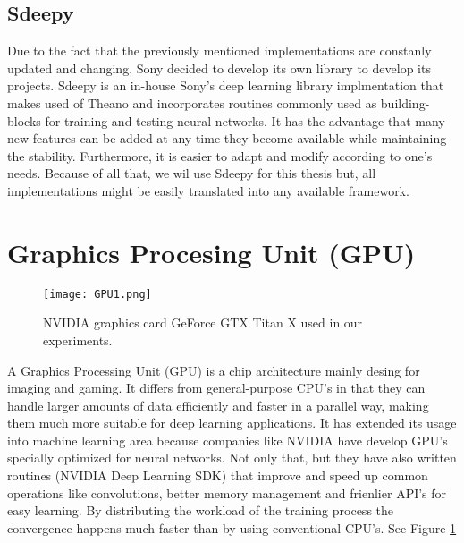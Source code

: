 \subsection{Sdeepy}
Due to the fact that the previously mentioned implementations are constanly updated and changing, Sony decided to develop its own library to develop its projects. Sdeepy is an in-house Sony's deep learning library implmentation that makes used of Theano and incorporates routines commonly used as building-blocks for training and testing neural networks. It has the advantage that many new features can be added at any time they become available while maintaining the stability. Furthermore, it is easier to adapt and modify according to one's needs. Because of all that, we wil use Sdeepy for this thesis but, all implementations might be easily translated into any available framework.
\section{Graphics Procesing Unit (GPU)}
\begin{figure}[tb] 
\centering 
\texttt{[image: GPU1.png]} 
\caption[GPU for deep learning]{NVIDIA graphics card GeForce GTX Titan X used in our experiments.}
\label{fig:GPUim1} 
\end{figure}
A Graphics Processing Unit (GPU) is a chip architecture mainly desing for imaging and gaming. It differs from general-purpose CPU's in that they can handle larger amounts of data efficiently and faster in a parallel way, making them much more suitable for deep learning applications. It has extended its usage into machine learning area because companies like NVIDIA have develop GPU's specially optimized for neural networks. Not only that, but they have also written routines (NVIDIA Deep Learning SDK) that improve and speed up common operations like convolutions, better memory management and frienlier API's for easy learning. By distributing the workload of the training process the convergence happens much faster than  by using conventional CPU's. See Figure \ref{fig:GPUim1}
